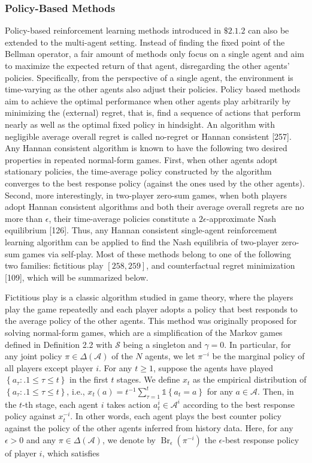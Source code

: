 \documentclass[10pt]{article}
\begin{document}
\subsubsection{Policy-Based Methods}
Policy-based reinforcement learning methods introduced in $\$ 2.1 .2$ can also be extended to the multi-agent setting. Instead of finding the fixed point of the Bellman operator, a fair amount of methods only focus on a single agent and aim to maximize the expected return of that agent, disregarding the other agents' policies. Specifically, from the perspective of a single agent, the environment is time-varying as the other agents also adjust their policies. Policy based methods aim to achieve the optimal performance when other agents play arbitrarily by minimizing the (external) regret, that is, find a sequence of actions that perform nearly as well as the optimal fixed policy in hindsight. An algorithm with negligible average overall regret is called no-regret or Hannan consistent [257]. Any Hannan consistent algorithm is known to have the following two desired properties in repeated normal-form games. First, when other agents adopt stationary policies, the time-average policy constructed by the algorithm converges to the best response policy (against the ones used by the other agents). Second, more interestingly, in two-player zero-sum games, when both players adopt Hannan consistent algorithms and both their average overall regrets are no more than $\epsilon$, their time-average policies constitute a $2 \epsilon$-approximate Nash equilibrium [126]. Thus, any Hannan consistent single-agent reinforcement learning algorithm can be applied to find the Nash equilibria of two-player zero-sum games via self-play. Most of these methods belong to one of the following two families: fictitious play $[258,259]$, and counterfactual regret minimization [109], which will be summarized below.

Fictitious play is a classic algorithm studied in game theory, where the players play the game repeatedly and each player adopts a policy that best responds to the average policy of the other agents. This method was originally proposed for solving normal-form games, which are a simplification of the Markov games defined in Definition 2.2 with $\mathcal{S}$ being a singleton and $\gamma=0$. In particular, for any joint policy $\pi \in \Delta(\mathcal{A})$ of the $N$ agents, we let $\pi^{-i}$ be the marginal policy of all players except player $i$. For any $t \geq 1$, suppose the agents have played $\left\{a_{\tau}: .1 \leq \tau \leq t\right\}$ in the first $t$ stages. We define $x_{t}$ as the empirical distribution of $\left\{a_{\tau}: .1 \leq \tau \leq t\right\}$, i.e., $x_{t}(a)=t^{-1} \sum_{\tau=1}^{t} \mathbb{1}\left\{a_{t}=a\right\}$ for any $a \in \mathcal{A}$. Then, in the $t$-th stage, each agent $i$ takes action $a_{t}^{i} \in \mathcal{A}^{i}$ according to the best response policy against $x_{t}^{-i}$. In other words, each agent plays the best counter policy against the policy of the other agents inferred from history data. Here, for any $\epsilon>0$ and any $\pi \in \Delta(\mathcal{A})$, we denote by $\operatorname{Br}_{\epsilon}\left(\pi^{-i}\right)$ the $\epsilon$-best response policy of player $i$, which satisfies
\end{document}
